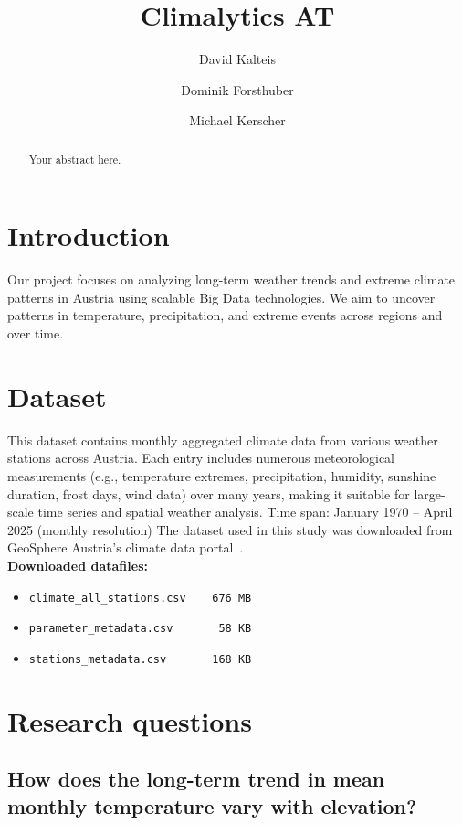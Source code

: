 \documentclass[sigconf]{acmart}
\title{Climalytics AT}
\author{David Kalteis}
\affiliation{\institution{FH Hagenberg}\department{Mobile Computing}\country{Austria}}
\author{Dominik Forsthuber}
\affiliation{\institution{FH Hagenberg}\department{Mobile Computing}\country{Austria}}
\author{Michael Kerscher}
\affiliation{\institution{FH Hagenberg}\department{Mobile Computing}\country{Austria}}
\begin{document}
\begin{abstract}
Your abstract here.
\end{abstract}

\maketitle

\section{Introduction}
Our project focuses on analyzing long-term weather trends and extreme climate patterns in Austria using scalable Big Data technologies. We aim to uncover patterns in temperature, precipitation, and extreme events across regions and over time.

\section{Dataset}
This dataset contains monthly aggregated climate data from various weather stations across Austria. Each entry includes numerous meteorological measurements (e.g., temperature extremes, precipitation, humidity, sunshine duration, frost days, wind data) over many years, making it suitable for large-scale time series and spatial weather analysis.
Time span: January 1970 – April 2025 (monthly resolution) \linebreak
The dataset used in this study was downloaded from GeoSphere Austria's climate data portal~\cite{geosphere_klima_v2_1m}.\\

\textbf{Downloaded datafiles:} 
\begin{itemize}
    \item \verb|climate_all_stations.csv    676 MB |
    \item \verb|parameter_metadata.csv       58 KB |
    \item \verb|stations_metadata.csv       168 KB |
\end{itemize}

\section{Research questions}
\subsection{How does the long-term trend in mean monthly temperature vary with elevation?}
\end{document}

